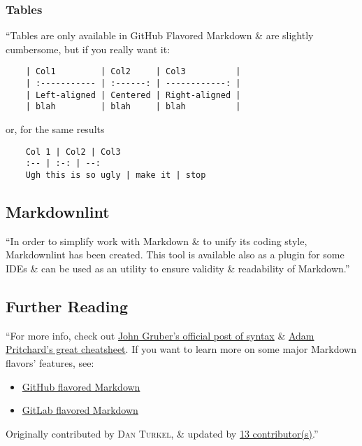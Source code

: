 \documentclass[oneside]{book}
\numberwithin{equation}{section}
\begin{document}
\subsubsection{Tables}
``Tables are only available in GitHub Flavored Markdown \& are slightly cumbersome, but if you really want it:
\begin{verbatim}
	| Col1         | Col2     | Col3          |
	| :----------- | :------: | ------------: |
	| Left-aligned | Centered | Right-aligned |
	| blah         | blah     | blah          |
\end{verbatim}
or, for the same results
\begin{verbatim}
	Col 1 | Col2 | Col3
	:-- | :-: | --:
	Ugh this is so ugly | make it | stop
\end{verbatim}

\subsection{Markdownlint}
``In order to simplify work with Markdown \& to unify its coding style, Markdownlint has been created. This tool is available also as a plugin for some IDEs \& can be used as an utility to ensure validity \& readability of Markdown.''

\subsection{Further Reading}
``For more info, check out \href{http://daringfireball.net/projects/markdown/syntax}{John Gruber's official post of syntax} \& \href{https://github.com/adam-p/markdown-here/wiki/Markdown-Cheatsheet}{Adam Pritchard's great cheatsheet}. If you want to learn more on some major Markdown flavors' features, see:
\begin{itemize}
	\item \href{https://docs.github.com/en/github/writing-on-github/getting-started-with-writing-and-formatting-on-github/basic-writing-and-formatting-syntax}{GitHub flavored Markdown}
	\item \href{https://docs.gitlab.com/ee/user/markdown.html}{GitLab flavored Markdown}
\end{itemize}
Originally contributed by \textsc{Dan Turkel}, \& updated by \href{https://github.com/adambard/learnxinyminutes-docs/blame/master/markdown.html.markdown}{13 contributor(s)}.'' 


\printbibliography[heading=bibintoc]
	
\end{document}
